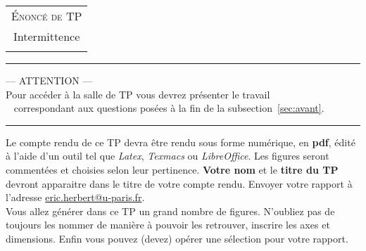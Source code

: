 \documentclass[12pt,a4,french]{article}
\begin{document}
	
	
	
	\chead{}
	
	
\begin{center}
    \begin{tabular}{c}
        {\Large  \textsc{Énoncé de TP}}\\
        {\Large{Intermittence}}\\
        \\
    \end{tabular}
    
    \normalsize 
    
    \hrule
    \vspace{0.5cm}
    
    --- ATTENTION ---\\
    Pour accéder à la salle de TP vous devrez présenter le travail \\ 
    correspondant aux questions posées à la fin de la subsection~\ref{sec:avant}.
    
    \vspace{0.5cm}
    \hrule
\end{center}



Le compte rendu de ce TP devra être rendu sous forme numérique, en \textbf{pdf},
édité à l'aide d'un outil tel que \textit{Latex}, \textit{Texmacs} ou \textit{LibreOffice}. Les figures seront
commentées et choisies selon leur pertinence.
\textbf{Votre nom} et le \textbf{titre du TP}  devront apparaitre dans le titre de votre compte rendu.
Envoyer votre rapport à l'adresse  \href{mailto:eric.herbert@u-paris.fr}{eric.herbert@u-paris.fr}. \\
Vous allez générer dans ce TP un grand nombre de figures. N'oubliez pas de toujours les nommer de manière à pouvoir les retrouver, inscrire les axes et dimensions. Enfin vous pouvez (devez) opérer une sélection pour votre rapport.
\end{document}
